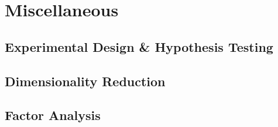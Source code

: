 \chapter{Miscellaneous}
\label{chap:misc}

\section{Experimental Design \& Hypothesis Testing}
\label{misc:exp_design}

\section{Dimensionality Reduction}
\label{misc:m_reduction}

\section{Factor Analysis}
\label{misc:factor_ana}


